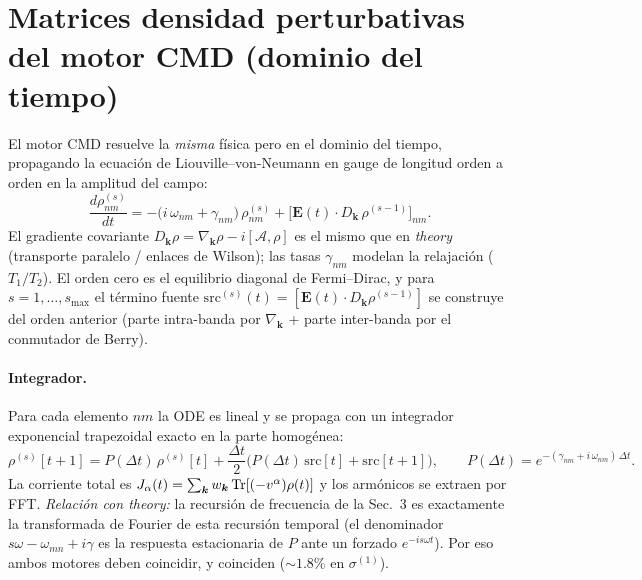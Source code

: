 \documentclass[11pt,a4paper]{article}
\newcommand{\kk}{\bm{k}}
\newcommand{\bE}{\bm{E}}
\begin{document}
\section{Matrices densidad perturbativas del motor CMD (dominio del tiempo)}
El motor CMD resuelve la \emph{misma} f\'isica pero en el dominio del
tiempo, propagando la ecuaci\'on de Liouville--von-Neumann en gauge de
longitud orden a orden en la amplitud del campo:
\begin{equation}
  \boxed{\;
  \frac{d\rho^{(s)}_{nm}}{dt} =
    -\big(i\,\omega_{nm} + \gamma_{nm}\big)\,\rho^{(s)}_{nm}
    + \big[\bE(t)\cdot D_{\kk}\,\rho^{(s-1)}\big]_{nm}. \;}
\end{equation}
El gradiente covariante $D_{\kk}\rho=\nabla_{\kk}\rho-i[\mathcal{A},\rho]$
es el mismo que en \emph{theory} (transporte paralelo / enlaces de
Wilson); las tasas $\gamma_{nm}$ modelan la relajaci\'on ($T_1/T_2$). El
orden cero es el equilibrio diagonal de Fermi--Dirac, y para
$s=1,\dots,s_{\max}$ el t\'ermino fuente
$\mathrm{src}^{(s)}(t)=[\bE(t)\cdot D_{\kk}\rho^{(s-1)}]$ se construye del
orden anterior (parte intra-banda por $\nabla_{\kk}$ + parte inter-banda
por el conmutador de Berry).

\paragraph{Integrador.} Para cada elemento $nm$ la ODE es lineal y se
propaga con un integrador exponencial trapezoidal exacto en la parte
homog\'enea:
\begin{equation}
  \rho^{(s)}[t{+}1] = P(\Delta t)\,\rho^{(s)}[t]
    + \frac{\Delta t}{2}\Big(P(\Delta t)\,\mathrm{src}[t] + \mathrm{src}[t{+}1]\Big),
  \qquad
  P(\Delta t) = e^{-(\gamma_{nm} + i\,\omega_{nm})\,\Delta t}.
\end{equation}
La corriente total es $J_\alpha(t)=\sum_{\kk}w_{\kk}\Tr[(-v^{\alpha})\rho(t)]$
y los arm\'onicos se extraen por FFT. \emph{Relaci\'on con theory:} la
recursi\'on de frecuencia de la Sec.~3 es exactamente la transformada de
Fourier de esta recursi\'on temporal (el denominador
$s\omega-\omega_{mn}+i\gamma$ es la respuesta estacionaria de $P$ ante un
forzado $e^{-is\omega t}$). Por eso ambos motores deben coincidir, y
coinciden ($\sim1.8\%$ en $\sigma^{(1)}$).

\end{document}
